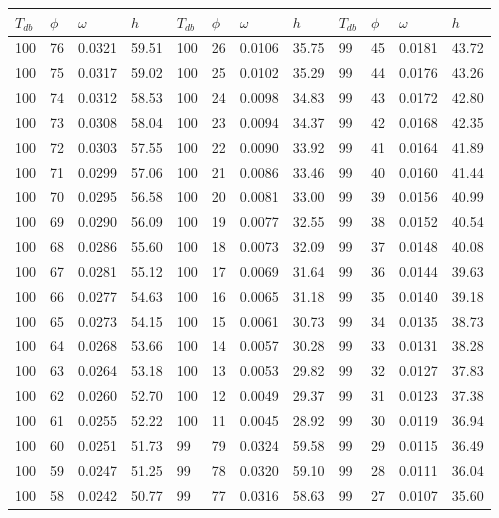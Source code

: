 \begin{tabular}{llll|llll|llll}
 \toprule 
\(T_{db}\) & \(\phi\) & \(\omega\) & \(h\) & \(T_{db}\) & \(\phi\) & \(\omega\) & \(h\) & \(T_{db}\) & \(\phi\) & \(\omega\) & \(h\)  \\ \midrule 
100 & 76 & 0.0321 & 59.51 & 100 & 26 & 0.0106 & 35.75 & 99 & 45 & 0.0181 & 43.72\\
100 & 75 & 0.0317 & 59.02 & 100 & 25 & 0.0102 & 35.29 & 99 & 44 & 0.0176 & 43.26\\
100 & 74 & 0.0312 & 58.53 & 100 & 24 & 0.0098 & 34.83 & 99 & 43 & 0.0172 & 42.80\\
100 & 73 & 0.0308 & 58.04 & 100 & 23 & 0.0094 & 34.37 & 99 & 42 & 0.0168 & 42.35\\
100 & 72 & 0.0303 & 57.55 & 100 & 22 & 0.0090 & 33.92 & 99 & 41 & 0.0164 & 41.89\\
100 & 71 & 0.0299 & 57.06 & 100 & 21 & 0.0086 & 33.46 & 99 & 40 & 0.0160 & 41.44\\
100 & 70 & 0.0295 & 56.58 & 100 & 20 & 0.0081 & 33.00 & 99 & 39 & 0.0156 & 40.99\\
100 & 69 & 0.0290 & 56.09 & 100 & 19 & 0.0077 & 32.55 & 99 & 38 & 0.0152 & 40.54\\
100 & 68 & 0.0286 & 55.60 & 100 & 18 & 0.0073 & 32.09 & 99 & 37 & 0.0148 & 40.08\\
100 & 67 & 0.0281 & 55.12 & 100 & 17 & 0.0069 & 31.64 & 99 & 36 & 0.0144 & 39.63\\
100 & 66 & 0.0277 & 54.63 & 100 & 16 & 0.0065 & 31.18 & 99 & 35 & 0.0140 & 39.18\\
100 & 65 & 0.0273 & 54.15 & 100 & 15 & 0.0061 & 30.73 & 99 & 34 & 0.0135 & 38.73\\
100 & 64 & 0.0268 & 53.66 & 100 & 14 & 0.0057 & 30.28 & 99 & 33 & 0.0131 & 38.28\\
100 & 63 & 0.0264 & 53.18 & 100 & 13 & 0.0053 & 29.82 & 99 & 32 & 0.0127 & 37.83\\
100 & 62 & 0.0260 & 52.70 & 100 & 12 & 0.0049 & 29.37 & 99 & 31 & 0.0123 & 37.38\\
100 & 61 & 0.0255 & 52.22 & 100 & 11 & 0.0045 & 28.92 & 99 & 30 & 0.0119 & 36.94\\
100 & 60 & 0.0251 & 51.73 & 99 & 79 & 0.0324 & 59.58 & 99 & 29 & 0.0115 & 36.49\\
100 & 59 & 0.0247 & 51.25 & 99 & 78 & 0.0320 & 59.10 & 99 & 28 & 0.0111 & 36.04\\
100 & 58 & 0.0242 & 50.77 & 99 & 77 & 0.0316 & 58.63 & 99 & 27 & 0.0107 & 35.60\\

\end{tabular}
